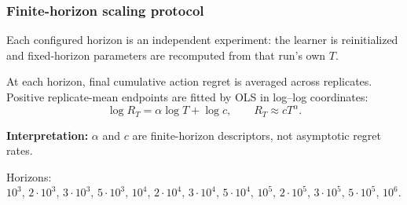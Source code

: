 \begin{frame}[noframenumbering]
  \frametitle{Finite-horizon scaling protocol}

  \small

  Each configured horizon is an independent experiment: the learner is
  reinitialized and fixed-horizon parameters are recomputed from that run's
  own $T$.

  \vspace{0.30cm}

  At each horizon, final cumulative action regret is averaged across
  replicates. Positive replicate-mean endpoints are fitted by OLS in
  log--log coordinates:
  \[
    \log R_T=\alpha\log T+\log c,
    \qquad
    R_T\approx cT^\alpha.
  \]

  {\bfseries Interpretation:}
  $\alpha$ and $c$ are finite-horizon descriptors, not asymptotic regret
  rates.

  \vspace{0.50cm}

  {\scriptsize
  Horizons:
  $10^3,\,2\!\cdot\!10^3,\,3\!\cdot\!10^3,\,5\!\cdot\!10^3,\,
  10^4,\,2\!\cdot\!10^4,\,3\!\cdot\!10^4,\,5\!\cdot\!10^4,\,
  10^5,\,2\!\cdot\!10^5,\,3\!\cdot\!10^5,\,5\!\cdot\!10^5,\,10^6$.}
\end{frame}
